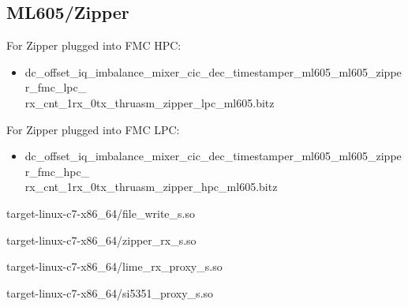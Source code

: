 \subsection{ML605/Zipper}
	For Zipper plugged into FMC HPC:
	\begin{itemize}
	\item
dc\_offset\_iq\_imbalance\_mixer\_cic\_dec\_timestamper\_ml605\_ml605\_zipper\_fmc\_lpc\_ \\ rx\_cnt\_1rx\_0tx\_thruasm\_zipper\_lpc\_ml605.bitz
 	\end{itemize}
	\noindent For Zipper plugged into FMC LPC:
	\begin{itemize}
	\item 
dc\_offset\_iq\_imbalance\_mixer\_cic\_dec\_timestamper\_ml605\_ml605\_zipper\_fmc\_hpc\_ \\
rx\_cnt\_1rx\_0tx\_thruasm\_zipper\_hpc\_ml605.bitz
	\end{itemize}
	\begin{itemize}
	\begin{minipage}[t]{.5\textwidth}
	\item target-linux-c7-x86\_64/file\_write\_s.so
	\item target-linux-c7-x86\_64/zipper\_rx\_s.so
	\end{minipage}
	\begin{minipage}[t]{.5\textwidth}
	\item target-linux-c7-x86\_64/lime\_rx\_proxy\_s.so
	\item target-linux-c7-x86\_64/si5351\_proxy\_s.so
	\end{minipage}
	\end{itemize}

